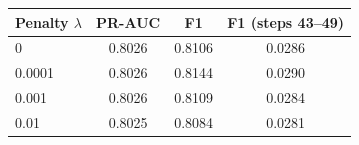 \begin{tabular}{lccc}
\toprule
Penalty $\lambda$ & PR-AUC & F1 & F1 (steps 43--49) \\
\midrule
0 & 0.8026 & 0.8106 & 0.0286 \\
0.0001 & 0.8026 & 0.8144 & 0.0290 \\
0.001 & 0.8026 & 0.8109 & 0.0284 \\
0.01 & 0.8025 & 0.8084 & 0.0281 \\
\bottomrule
\end{tabular}
